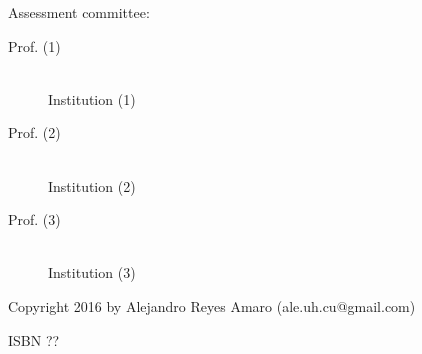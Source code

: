 \begin{vcentrepage}
{ \begin{center}\Large Assessment committee:  \end{center}}
\vspace{1em}
\begin{description}
\item[Prof. (1)] \hfill \\
Institution (1)
\item[Prof. (2)] \hfill \\
Institution (2)
\item[Prof. (3)] \hfill \\
Institution (3)
\end{description}
\pagestyle{plain}

\vspace{7cm}
\noindent Copyright \textcopyright{} 2016 by Alejandro {\sc Reyes Amaro} (ale.uh.cu@gmail.com)

\vspace{3cm}
\hfill ISBN ??
\end{vcentrepage}
